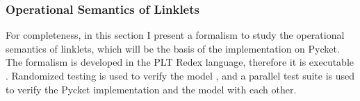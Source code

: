 \subsubsection{Operational Semantics of Linklets}
\label{subsec:linklets-semantics}

For completeness, in this section I present a formalism to study the
operational semantics of linklets, which will be the basis of the
implementation on Pycket. The formalism is developed in the PLT Redex
language, therefore it is executable
\cite{felleisen2009semantics}. Randomized testing is used to verify
the model \cite{random-test:2009}, and a parallel test suite is used
to verify the Pycket implementation and the model with each other.
